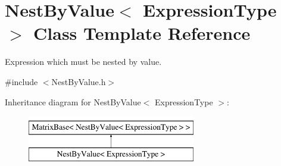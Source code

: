 \hypertarget{class_nest_by_value}{\section{Nest\-By\-Value$<$ Expression\-Type $>$ Class Template Reference}
\label{class_nest_by_value}
}


Expression which must be nested by value.  




{\ttfamily \#include $<$Nest\-By\-Value.\-h$>$}

Inheritance diagram for Nest\-By\-Value$<$ Expression\-Type $>$\-:\begin{figure}[H]
\begin{center}
\leavevmode
\includegraphics[height=2.000000cm]{class_nest_by_value}
\end{center}
\end{figure}
